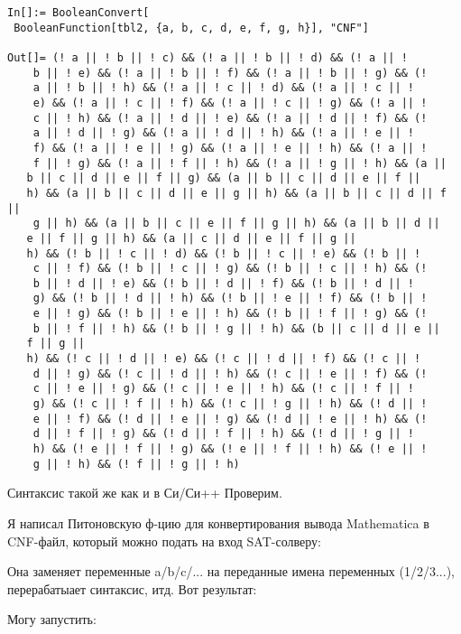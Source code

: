 \begin{lstlisting}
In[]:= BooleanConvert[
 BooleanFunction[tbl2, {a, b, c, d, e, f, g, h}], "CNF"]

Out[]= (! a || ! b || ! c) && (! a || ! b || ! d) && (! a || ! 
    b || ! e) && (! a || ! b || ! f) && (! a || ! b || ! g) && (! 
    a || ! b || ! h) && (! a || ! c || ! d) && (! a || ! c || ! 
    e) && (! a || ! c || ! f) && (! a || ! c || ! g) && (! a || ! 
    c || ! h) && (! a || ! d || ! e) && (! a || ! d || ! f) && (! 
    a || ! d || ! g) && (! a || ! d || ! h) && (! a || ! e || ! 
    f) && (! a || ! e || ! g) && (! a || ! e || ! h) && (! a || ! 
    f || ! g) && (! a || ! f || ! h) && (! a || ! g || ! h) && (a || 
   b || c || d || e || f || g) && (a || b || c || d || e || f || 
   h) && (a || b || c || d || e || g || h) && (a || b || c || d || f ||
    g || h) && (a || b || c || e || f || g || h) && (a || b || d || 
   e || f || g || h) && (a || c || d || e || f || g || 
   h) && (! b || ! c || ! d) && (! b || ! c || ! e) && (! b || ! 
    c || ! f) && (! b || ! c || ! g) && (! b || ! c || ! h) && (! 
    b || ! d || ! e) && (! b || ! d || ! f) && (! b || ! d || ! 
    g) && (! b || ! d || ! h) && (! b || ! e || ! f) && (! b || ! 
    e || ! g) && (! b || ! e || ! h) && (! b || ! f || ! g) && (! 
    b || ! f || ! h) && (! b || ! g || ! h) && (b || c || d || e || 
   f || g || 
   h) && (! c || ! d || ! e) && (! c || ! d || ! f) && (! c || ! 
    d || ! g) && (! c || ! d || ! h) && (! c || ! e || ! f) && (! 
    c || ! e || ! g) && (! c || ! e || ! h) && (! c || ! f || ! 
    g) && (! c || ! f || ! h) && (! c || ! g || ! h) && (! d || ! 
    e || ! f) && (! d || ! e || ! g) && (! d || ! e || ! h) && (! 
    d || ! f || ! g) && (! d || ! f || ! h) && (! d || ! g || ! 
    h) && (! e || ! f || ! g) && (! e || ! f || ! h) && (! e || ! 
    g || ! h) && (! f || ! g || ! h)
\end{lstlisting}

Синтаксис такой же как и в Си/Си++
Проверим.

Я написал Питоновскую ф-цию для конвертирования вывода Mathematica в \ac{CNF}-файл, который можно подать на вход
SAT-солверу:



Она заменяет переменные a/b/c/... на переданные имена переменных (1/2/3...), перерабатыает синтаксис, итд.
Вот результат:



Могу запустить:

